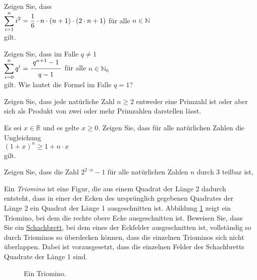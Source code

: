 \exercise
Zeigen Sie, dass
\\[0.2cm]
\hspace*{1.3cm}
$\displaystyle\sum\limits_{i=1}^{n} i^2 = \frac{1}{6} \cdot n \cdot (n+1) \cdot (2 \cdot n + 1)$ \quad
f\"{u}r alle $n \in \mathbb{N}$ 
\\[0.2cm]
gilt.  \exend

\exercise
Zeigen Sie, dass im Falle $q \not= 1$
\\[0.2cm]
\hspace*{1.3cm}
$\ds\sum\limits_{i=0}^{n} q^i = \bruch{q^{n+1} - 1}{q - 1}$ \quad
f\"{u}r alle $n \in \mathbb{N}_0$ 
\\[0.2cm]
gilt.  Wie lautet die Formel im Falle $q=1$? \exend


\exercise  
Zeigen Sie, dass jede nat\"{u}rliche Zahl $n \geq 2$ entweder eine Primzahl ist oder aber sich als  
Produkt von zwei oder mehr Primzahlen darstellen l\"{a}sst.  
\exend  

 
\exercise
Es sei $x \in \mathbb{R}$ und es gelte $x \geq 0$.  Zeigen Sie, dass f\"{u}r alle nat\"{u}rlichen Zahlen die Ungleichung
\\[0.2cm]
\hspace*{1.3cm}
$(1+x)^{n} \geq 1 + n \cdot x$
\\[0.2cm]
gilt.  
\exend


\exercise 
Zeigen Sie, dass die Zahl $2^{2 \cdot n} - 1$ f\"{u}r alle nat\"{u}rlichen Zahlen $n$ durch $3$
teilbar ist,
\exend 


\exercise
Ein \emph{Triomino} ist eine Figur, die aus einem Quadrat der L\"{a}nge 2 dadurch entsteht, dass in
einer  der Ecken des urspr\"{u}nglich gegebenen Quadrates der L\"{a}nge 2 ein Quadrat der L\"{a}nge 1
ausgeschnitten ist.  Abbildung \ref{fig:triomino.eps} zeigt 
ein Triomino, bei dem die rechte obere Ecke ausgeschnitten ist.  Beweisen Sie, dass Sie ein 
\href{http://de.wikipedia.org/wiki/Schachbrett}{Schachbrett}, bei dem eines der Eckfelder
ausgeschnitten ist, vollst\"{a}ndig so durch Triominos so \"{u}berdecken k\"{o}nnen, dass die einzelnen
Triominos sich nicht \"{u}berlappen.  Dabei ist vorausgesetzt, dass die einzelnen Felder des
Schachbretts Quadrate der L\"{a}nge 1 sind.

\begin{figure}[!ht]
  \centering
  \caption{Ein Triomino.}
  \label{fig:triomino.eps}
\end{figure}

\vspace*{0.2cm}
 
